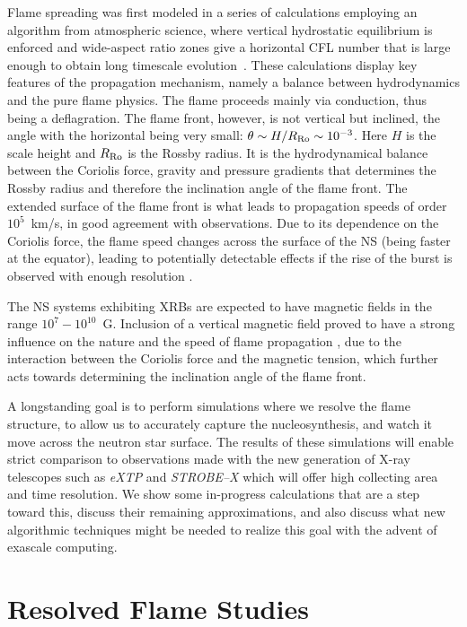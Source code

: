 \documentclass[a4paper]{jpconf}
\begin{document}
Flame spreading was first modeled in a series of calculations
employing an algorithm from atmospheric science, where vertical
hydrostatic equilibrium is enforced and wide-aspect ratio zones give a
horizontal CFL number that is large enough to obtain long timescale
evolution~\cite{cavecchi:2012}.
%
These calculations display key features of the propagation
mechanism, namely a balance between hydrodynamics and the pure
flame physics. The flame proceeds mainly via conduction, thus being a
deflagration. The flame front, however, is not vertical but inclined,
the angle with the horizontal being very small: $\theta \sim
H/R_{\rm{Ro}} \sim 10^{-3}$. Here $H$ is the scale height and
$R_{\rm{Ro}}$ is the Rossby radius. It is the hydrodynamical balance
between the Coriolis force, gravity and pressure gradients that
determines the Rossby radius and therefore the inclination angle of the
flame front. The extended surface of the flame front is what leads to
propagation speeds of order $10^5 $~km/s, in good agreement with
observations. Due to its dependence on the Coriolis force, the flame
speed changes across the surface of the NS (being faster at the
equator), leading to potentially detectable effects if the rise of the
burst is observed with enough resolution
\cite{art-2015-cavecchi-etal}.

The NS systems exhibiting XRBs are
expected to have magnetic fields in the range $10^7 - 10^{10}$~G.
Inclusion of a vertical magnetic field proved to have a strong
influence on the nature and the speed of flame propagation
\cite{art-2016-cavecchi-etal}, due to the interaction between the
Coriolis force and the magnetic tension, which further acts towards
determining the inclination angle of the flame front.

A longstanding goal is to perform simulations where we resolve the
flame structure, to allow us to accurately capture the
nucleosynthesis, and watch it move across the neutron star surface.
The results of these simulations will enable strict comparison to
observations made with the new generation of X-ray telescopes such as
\textit{eXTP} and \textit{STROBE--X}
\cite{art-2017-wilhod-etal,art-2016-zhang-etal} which will offer
high collecting area and time resolution.
We show some in-progress calculations that are a step toward this, discuss
their remaining approximations, and also discuss what new algorithmic
techniques might be needed to realize this goal with the advent of
exascale computing.



\section{Resolved Flame Studies}
\end{document}
